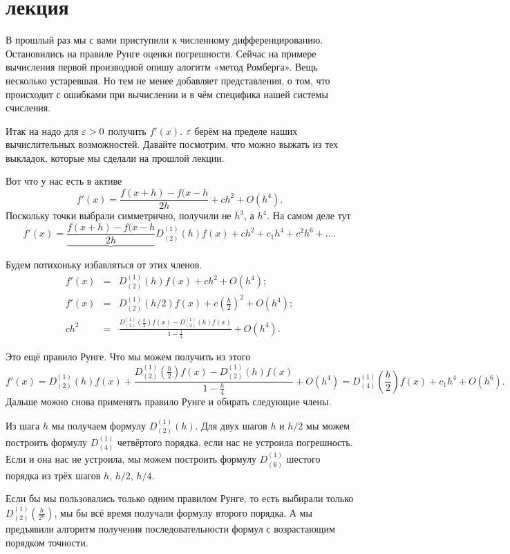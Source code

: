\section{лекция}

В прошлый раз мы с вами приступили к численному дифференцированию. Остановились на правиле Рунге оценки погрешности. Сейчас на примере вычисления первой производной опишу алогитм «метод Ромберга». Вещь несколько устаревшая. Но тем не менее добавляет представления, о том, что происходит с ошибками при вычислении и в чём специфика нашей системы счисления.

Итак на надо для $\varepsilon>0$ получить $f'(x)$. $\varepsilon$ берём на пределе наших вычислительных возможностей. Давайте посмотрим, что можно выжать из тех выкладок, которые мы сделали на прошлой лекции.

Вот что у нас есть в активе
\[
  f'(x) = \frac{f(x+h) -f(x-h}{2h} + c h^2 + O(h^4).
\]
Поскольку точки выбрали симметрично, получили не $h^3$, а $h^4$.
На самом деле тут
\[
  f'(x) = \underbrace{\frac{f(x+h) -f(x-h}{2h}}{D_{(2)}^{(1)}(h)f(x)} + c h^2 + c_1 h^4 + c^2 h^6+ \dots.
\]

Будем потихоньку избавляться от этих членов.
  \begin{eqnarray*}
f'(x) &=&  D_{(2)}^{(1)}(h)f(x) + ch^2 + O(h^4);\\
f'(x) &=& D_{(2)}^{(1)}(h/2)f(x) + c\left( \frac h2 \right)^2 + O(h^4);\\
 ch^2 &=&  \frac{D_{(2)}^{(1)}\left( \frac h2 \right)f(x) - D_{(2)}^{(1)}(h)f(x)}{1 - \frac14} + O(h^4).
\end{eqnarray*}

Это ещё правило Рунге. Что мы можем получить из этого
\[
  f'(x) = D_{(2)}^{(1)}(h)f(x) + \frac{D_{(2)}^{(1)}\left( \frac h2 \right)f(x) - D_{(2)}^{(1)}(h) f(x)}{1 - \frac h4} + O(h^4)=
  D_{(4)}^{(1)}\left( \frac h2 \right)f(x) + c_1 h^4 + O(h^6).
\]
Дальше можно снова применять правило Рунге и обирать следующие члены.

Из шага $h$ мы получаем формулу $D_{(2)}^{(1)}(h)$. Для двух шагов $h$ и $h/2$ мы можем построить формулу $D_{(4)}^{(1)}$ четвёртого порядка, если нас не устроила погрешность. Если и она нас не устроила, мы можем построить формулу $D_{(6)}^{(1)}$ шестого порядка из трёх шагов $h$, $h/2$, $h/4$.

Если бы мы пользовались только одним правилом Рунге, то есть выбирали только $D_{(2)}^{(1)}\left( \frac h{2^n} \right)$, мы бы всё время получали формулу второго порядка. А мы предъявили алгоритм получения последовательности формул с возрастающим порядком точности.

